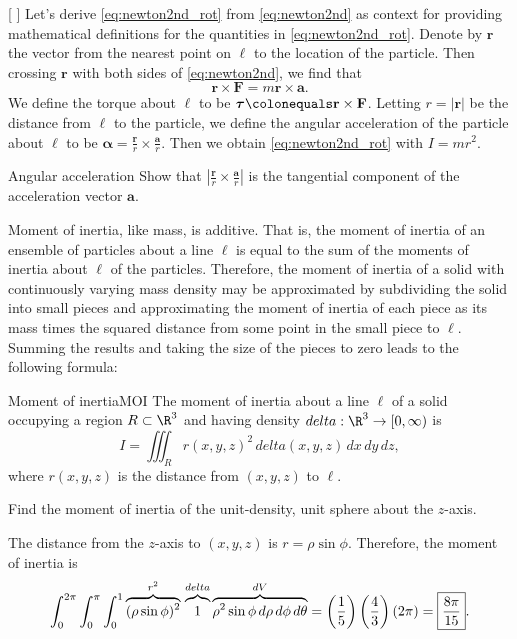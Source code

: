 \documentclass[indent]{watsonbook}
\begin{document}
{\begin{insetfigure}{\usebox{\asybox}}[ \label{fig:MOI}]
  Let's derive \eqref{eq:newton2nd_rot} from \eqref{eq:newton2nd} as
  context for providing mathematical definitions for the quantities in
  \eqref{eq:newton2nd_rot}. Denote by $\mathbf{r}$ the vector from the
  nearest point on $\ell$ to the location of the particle. Then
  crossing $\mathbf{r}$ with both sides of \eqref{eq:newton2nd}, we
  find that
  \[
    \mathbf{r} \times \mathbf{F} = m \mathbf{r} \times \mathbf{a}.
  \]
  We define the torque about $\ell$ to be $\boldsymbol{\tau} \colonequals
  \mathbf{r} \times \mathbf{F}$. Letting $r = |\mathbf{r}|$ be the
  distance from $\ell$ to the particle, we define the angular
  acceleration of the particle about $\ell$ to be $\boldsymbol{\alpha} =
  \frac{\mathbf{r}}{r} \times \frac{\mathbf{a}}{r}$. Then we obtain
  \eqref{eq:newton2nd_rot} with $I = mr^2$.
\end{insetfigure}

\begin{exercise}{Angular acceleration}{}
  Show that $\left|\frac{\mathbf{r}}{r} \times
    \frac{\mathbf{a}}{r}\right|$ is the tangential component of
  the acceleration vector $\mathbf{a}$.
\end{exercise}

Moment of inertia, like mass, is additive. That is, the moment of
inertia of an ensemble of particles about a line $\ell$ is equal to
the sum of the moments of inertia about $\ell$ of the
particles. Therefore, the moment of inertia of a solid with
continuously varying mass density may be approximated by subdividing
the solid into small pieces and approximating the moment of inertia of
each piece as its mass times the squared distance from some point in
the small piece to $\ell$. Summing the results and taking the size of
the pieces to zero leads to the following formula:
\begin{defn}{Moment of inertia}{MOI}
  The moment of inertia about a line $\ell$ of a solid occupying a
  region $R\subset \R^3$ and having density ${d}elta: \R^3 \to [0,\infty)$ is
  \[
    I = \iiint_{R} r(x,y,z)^2 \, {d}elta(x,y,z) \, {d} x \, {d} y\, {d} z,
  \]
  where $r(x,y,z)$ is the distance from $(x,y,z)$ to $\ell$.
\end{defn}

\begin{example}{}{}
  Find the moment of inertia of the unit-density, unit sphere about
  the $z$-axis.
\end{example}

\begin{solution}
  The distance from the $z$-axis to $(x,y,z)$ is $r = \rho \sin
  \phi$. Therefore, the moment of inertia is
  \[
    \int_{0}^{2\pi}\int_0^\pi \int_0^1 \overbrace{(\rho \sin
      \phi)^2}^{r^2} \, \overbrace{\vphantom{\rho^2}
      1}^{{d}elta}\overbrace{\rho^2 \sin \phi \, {d}\rho \, {d}\phi \,
      {d}\theta}^{{d} V} = \left(\frac{1}{5}\right)
    \left(\frac{4}{3}\right) \left(2\pi\right) =
    \boxed{\frac{8\pi}{15}}.
  \]
\end{solution}

}
\end{document}
